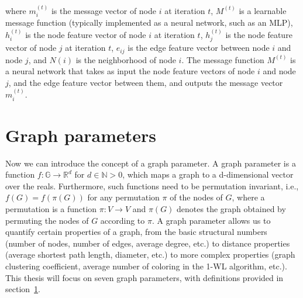 where $m_i^{(t)}$ is the message vector of node $i$ at iteration $t$, $M^{(t)}$ is a learnable message function (typically implemented as a neural network, such as an MLP), $h_i^{(t)}$ is the node feature vector of node $i$ at iteration $t$, $h_j^{(t)}$ is the node feature vector of node $j$ at iteration $t$, $e_{ij}$ is the edge feature vector between node $i$ and node $j$, and $N(i)$ is the neighborhood of node $i$. The message function $M^{(t)}$ is a neural network that takes as input the node feature vectors of node $i$ and node $j$, and the edge feature vector between them, and outputs the message vector $m_i^{(t)}$.

\section{Graph parameters} \label{sec:graph_parameters}
Now we can introduce the concept of a graph parameter. A graph parameter is a function $f: \mathbb{G} \rightarrow \mathbb{R}^d$ for $d\in \mathbb{N} >0$, which maps a graph to a d-dimensional vector over the reals. Furthermore, such functions need to be permutation invariant, i.e., $f(G) = f(\pi(G))$ for any permutation $\pi$ of the nodes of $G$, where a permutation is a function $\pi: V \rightarrow V$ and $\pi(G)$ denotes the graph obtained by permuting the nodes of $G$ according to $\pi$. A graph parameter allows us to quantify certain properties of a graph, from the basic structural numbers (number of nodes, number of edges, average degree, etc.) to distance properties (average shortest path length, diameter, etc.) to more complex properties (graph clustering coefficient, average number of coloring in the 1-WL algorithm, etc.). This thesis will focus on seven graph parameters, with definitions provided in section~\ref{sec:graph_parameters}.